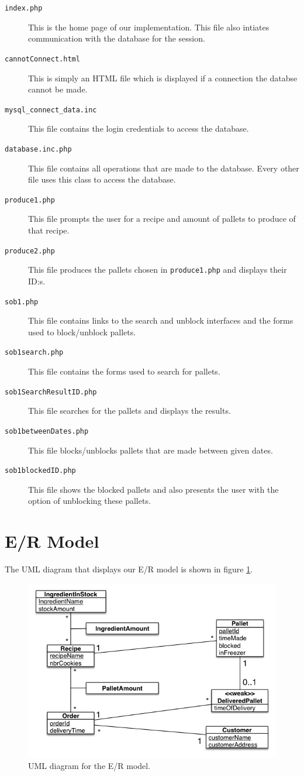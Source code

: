 \documentclass[a4paper]{article}
\begin{document}
\begin{description}
\item[\texttt{index.php}] This is the home page of our implementation. This file also intiates communication with the database for the session.
\item[\texttt{cannotConnect.html}] This is simply an HTML file which is displayed if a connection the databse cannot be made.
\item[\texttt{mysql\_connect\_data.inc}] This file contains the login credentials to access the database.
\item[\texttt{database.inc.php}] This file contains all operations that are made to the database. Every other file uses this class to access the database.
\item[\texttt{produce1.php}] This file prompts the user for a recipe and amount of pallets to produce of that recipe.
\item[\texttt{produce2.php}] This file produces the pallets chosen in \texttt{produce1.php} and displays their ID:s.
\item[\texttt{sob1.php}] This file contains links to the search and unblock interfaces and the forms used to block/unblock pallets.
\item[\texttt{sob1search.php}] This file contains the forms used to search for pallets.
\item[\texttt{sob1SearchResultID.php}] This file searches for the pallets and displays the results.
\item[\texttt{sob1betweenDates.php}] This file blocks/unblocks pallets that are made between given dates.
\item[\texttt{sob1blockedID.php}] This file shows the blocked pallets and also presents the user with the option of unblocking these pallets.
\end{description}
\section{E/R Model}
The UML diagram that displays our E/R model is shown in figure \ref{uml}.

\begin{figure}[t]
\centering
\includegraphics[scale=0.7]{projectUMLFinal.png}
\caption{UML diagram for the E/R model.}
\label{uml}
\end{figure}
\end{document}
